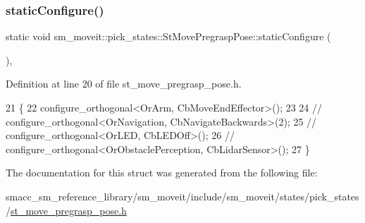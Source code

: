\subsubsection{\texorpdfstring{static\+Configure()}{staticConfigure()}}
{\footnotesize\ttfamily static void sm\+\_\+moveit\+::pick\+\_\+states\+::\+St\+Move\+Pregrasp\+Pose\+::static\+Configure (\begin{DoxyParamCaption}{ }\end{DoxyParamCaption})\hspace{0.3cm}{\ttfamily [inline]}, {\ttfamily [static]}}



Definition at line 20 of file st\+\_\+move\+\_\+pregrasp\+\_\+pose.\+h.


\begin{DoxyCode}
21     \{
22         configure\_orthogonal<OrArm, CbMoveEndEffector>();
23 
24         \textcolor{comment}{//   configure\_orthogonal<OrNavigation, CbNavigateBackwards>(2);}
25         \textcolor{comment}{//   configure\_orthogonal<OrLED, CbLEDOff>();}
26         \textcolor{comment}{//   configure\_orthogonal<OrObstaclePerception, CbLidarSensor>();}
27     \}
\end{DoxyCode}


The documentation for this struct was generated from the following file\+:\begin{DoxyCompactItemize}
\item 
smacc\+\_\+sm\+\_\+reference\+\_\+library/sm\+\_\+moveit/include/sm\+\_\+moveit/states/pick\+\_\+states/\hyperlink{st__move__pregrasp__pose_8h}{st\+\_\+move\+\_\+pregrasp\+\_\+pose.\+h}\end{DoxyCompactItemize}
